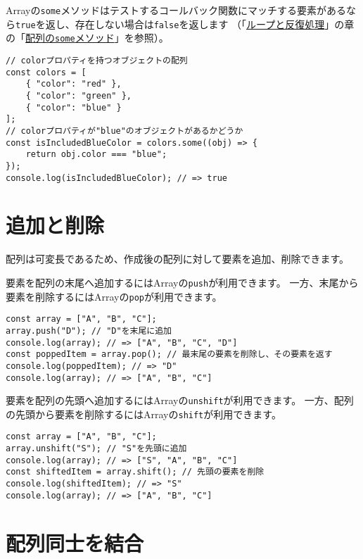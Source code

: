Arrayの\texttt{some}メソッドはテストするコールバック関数にマッチする要素があるなら\texttt{true}を返し、存在しない場合は\texttt{false}を返します
（「\hyperlink{loop-and-iteration}{ループと反復処理}」の章の「\hyperlink{array-some}{配列の\texttt{some}メソッド}」を参照）。

\begin{lstlisting}
// colorプロパティを持つオブジェクトの配列
const colors = [
    { "color": "red" },
    { "color": "green" },
    { "color": "blue" }
];
// colorプロパティが"blue"のオブジェクトがあるかどうか
const isIncludedBlueColor = colors.some((obj) => {
    return obj.color === "blue";
});
console.log(isIncludedBlueColor); // => true
\end{lstlisting}

\hypertarget{add-and-delete}{%
\section{追加と削除}\label{add-and-delete}}

配列は可変長であるため、作成後の配列に対して要素を追加、削除できます。

要素を配列の末尾へ追加するにはArrayの\texttt{push}が利用できます。
一方、末尾から要素を削除するにはArrayの\texttt{pop}が利用できます。

\begin{lstlisting}
const array = ["A", "B", "C"];
array.push("D"); // "D"を末尾に追加
console.log(array); // => ["A", "B", "C", "D"]
const poppedItem = array.pop(); // 最末尾の要素を削除し、その要素を返す
console.log(poppedItem); // => "D"
console.log(array); // => ["A", "B", "C"]
\end{lstlisting}

要素を配列の先頭へ追加するにはArrayの\texttt{unshift}が利用できます。
一方、配列の先頭から要素を削除するにはArrayの\texttt{shift}が利用できます。

\begin{lstlisting}
const array = ["A", "B", "C"];
array.unshift("S"); // "S"を先頭に追加
console.log(array); // => ["S", "A", "B", "C"]
const shiftedItem = array.shift(); // 先頭の要素を削除
console.log(shiftedItem); // => "S"
console.log(array); // => ["A", "B", "C"]
\end{lstlisting}

\hypertarget{concat}{%
\section{配列同士を結合}\label{concat}}

